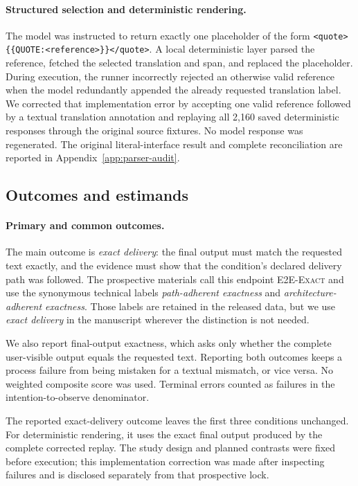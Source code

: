 \documentclass[11pt]{article}
\newcommand{\eetwo}{\textsc{E2E-Exact}}
\begin{document}
\paragraph{Structured selection and deterministic rendering.}
The model was instructed to return exactly one placeholder of the form
\texttt{<quote>\{\{QUOTE:<reference>\}\}</quote>}. A local deterministic
layer parsed the reference, fetched the selected translation and span, and replaced
the placeholder. During execution, the runner incorrectly rejected an otherwise
valid reference when the model redundantly appended the already requested
translation label. We corrected that implementation error by accepting one
valid reference followed by a textual translation annotation and replaying all 2,160
saved deterministic responses through the original source fixtures. No model
response was regenerated. The original literal-interface result and complete
reconciliation are reported in Appendix~\ref{app:parser-audit}.

\subsection{Outcomes and estimands}
\label{sec:analysis}

\paragraph{Primary and common outcomes.}

The main outcome is \emph{exact delivery}: the final output must match the
requested text exactly, and the evidence must show that the condition's
declared delivery path was followed. The prospective materials call this
endpoint \eetwo{} and use the synonymous technical labels \emph{path-adherent
exactness} and \emph{architecture-adherent exactness}. Those labels are
retained in the released data, but we use \emph{exact delivery} in the
manuscript wherever the distinction is not needed.

We also report final-output exactness, which asks only whether the complete
user-visible output equals the requested text. Reporting both outcomes keeps a
process failure from being mistaken for a textual mismatch, or vice versa. No
weighted composite score was used. Terminal errors counted as failures in the
intention-to-observe denominator.

The reported exact-delivery outcome leaves the first three conditions unchanged.
For deterministic rendering, it uses the exact final output produced by the
complete corrected replay. The study design and planned contrasts were fixed
before execution; this implementation correction was made after inspecting
failures and is disclosed separately from that prospective lock.
\end{document}
